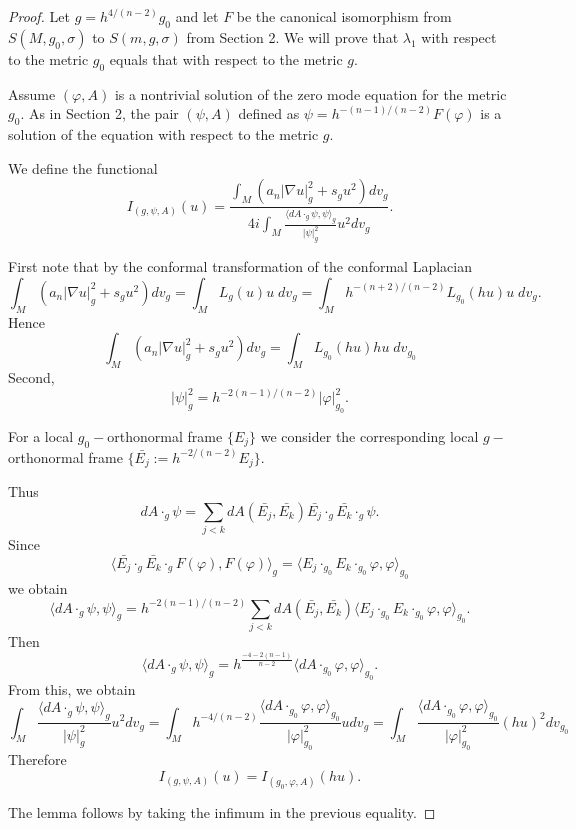 \documentclass[10pt,a4paper]{amsart}
\begin{document}
\begin{proof}
Let $g=h^{4/(n-2)}g_0$ and let $F$ be the canonical isomorphism from $S(M,g_0,\sigma)$ to $S(m,g,\sigma)$ from Section 2.
We will prove that $\lambda_1$ with respect to the metric $g_0$ equals that with respect to the metric $g$.

Assume $(\varphi,A)$ is a nontrivial solution of the zero mode equation for the metric $g_0$. As in Section 2, the pair $(\psi,A)$ defined as $\psi=h^{-(n-1)/(n-2)}F(\varphi)$ is a solution of the equation with respect to the metric $g$.

We define the functional
$$I_{(g,\psi,A)}(u)=\dfrac{\int_M(a_n|\nabla u|_g^2+s_gu^2)dv_g}{4i\int_M \frac{\langle dA\cdot_g\psi,\psi\rangle_g}{|\psi|_g^2}  u^2dv_g  }.$$

First note that by the conformal transformation of the conformal Laplacian $$\int_M(a_n|\nabla u|_g^2+s_gu^2)dv_g=\int_M L_g(u)u\;dv_g=\int_Mh^{-(n+2)/(n-2)}L_{g_0}(hu)u\;dv_{g}.$$
Hence $$\int_M(a_n|\nabla u|_g^2+s_gu^2)dv_g=\int_ML_{g_0}(hu)hu\;dv_{g_0}$$
Second, $$|\psi|_{g}^2=h^{-2(n-1)/(n-2)}|\varphi|_{g_0}^2.$$

For a local $g_0-$orthonormal frame $\{E_j\}$  we consider the corresponding local $g-$orthonormal frame $\{\bar{E_j}:=h^{-2/(n-2)}E_j\}.$

Thus 
$$
dA\cdot_{g}\psi=\sum\limits_{j<k}dA(\bar{E_j},\bar{E_k})\bar{E_j}\cdot_{g} \bar{E_k}\cdot_{g}\psi.
$$
Since $$\langle \bar{E_j}\cdot_{g} \bar{E_k}\cdot_{g}F(\varphi),F(\varphi)\rangle_g=\langle E_j\cdot_{g_0} E_k\cdot_{g_0}\varphi,\varphi\rangle_{g_0}$$
we obtain $$\langle dA\cdot_{g}\psi,\psi\rangle_g=h^{-2(n-1)/(n-2)}\sum\limits_{j<k}dA(\bar{E_j},\bar{E_k})\langle E_j\cdot_{g_0} E_k\cdot_{g_0}\varphi,\varphi\rangle_{g_0}.$$
Then $$\langle dA\cdot_{g}\psi,\psi\rangle_g=h^{\frac{-4-2(n-1)}{n-2}}\langle dA\cdot_{g_0}\varphi,\varphi\rangle_{g_0}.$$
From this, we obtain 
$$\int_M \frac{\langle dA\cdot_g\psi,\psi\rangle_g}{|\psi|_g^2}  u^2dv_g =\int_M h^{-4/(n-2)}\frac{\langle dA\cdot_{g_0}\varphi,\varphi\rangle_{g_0}}{|\varphi|_{g_0}^2}  udv_{g}=\int_M \frac{\langle dA\cdot_{g_0}\varphi,\varphi\rangle_{g_0}}{|\varphi|_{g_0}^2}  (hu)^2dv_{g_0} $$
Therefore $$I_{(g,\psi,A)}(u)=I_{(g_0,\varphi,A)}(hu).$$

The lemma follows by taking the infimum in the previous equality. 
\end{proof}
\end{document}
